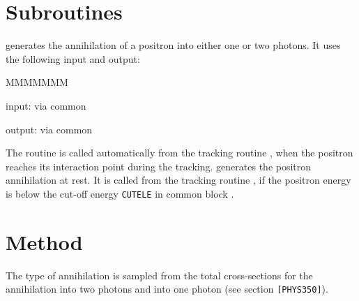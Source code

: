     
\section{Subroutines}
 
 generates the annihilation of a positron into either one
or two photons. It uses the following input and output:
\begin{DLtt}{MMMMMMM}
\item[input:]  via common 
\item[output:] via common 
\end{DLtt}
The routine is called automatically from the tracking routine
, when the positron reaches its interaction
point during the tracking.
 generates the positron annihilation at rest. It is
called from the tracking routine , if the positron
energy is below the cut-off energy {\tt CUTELE} in common block .
\section{Method }
The type of annihilation is sampled from the total cross-sections
for the annihilation into two photons and into one photon (see
section {\tt [PHYS350]}).
